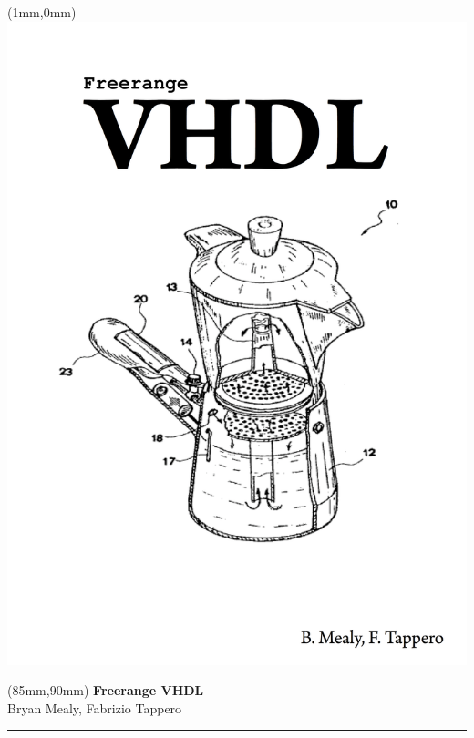 \documentclass[11pt,b5paper]{book}
\begin{document}
	\thispagestyle{empty}
	\begin{textblock*}{174mm}(1mm,0mm)
	\includegraphics[width=169mm]{pics/cover1.png}%
	\end{textblock*}
	\null\newpage %

	\thispagestyle{empty}
	\null\newpage

	\thispagestyle{empty}
	\begin{textblock*}{60mm}(85mm,90mm)
	\noindent
	{\sffamily\huge\bfseries Freerange VHDL}\\
	\noindent
	{\sffamily Bryan Mealy, Fabrizio Tappero}\\
	{\color{dark-gray}\rule[5pt]{190pt}{4pt}}
	\end{textblock*}
	\null\newpage
\end{document}
